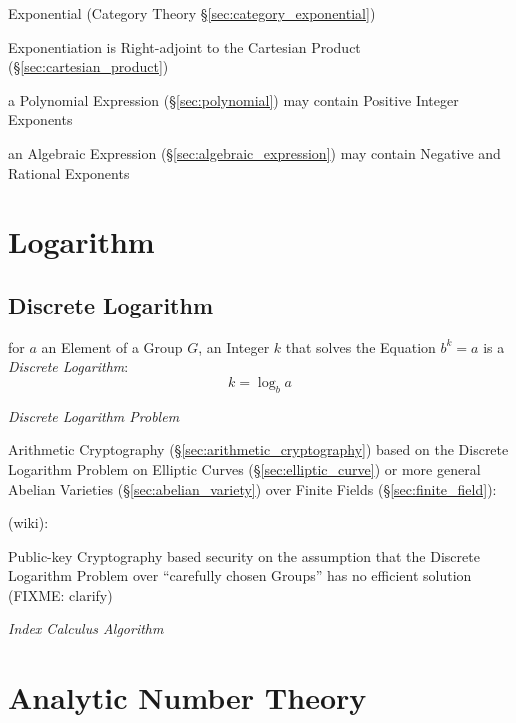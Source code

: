 \fist Exponential (Category Theory \S\ref{sec:category_exponential})

Exponentiation is Right-adjoint to the Cartesian Product
(\S\ref{sec:cartesian_product})

a Polynomial Expression (\S\ref{sec:polynomial}) may contain
Positive Integer Exponents

an Algebraic Expression (\S\ref{sec:algebraic_expression}) may contain Negative
and Rational Exponents



\section{Logarithm}\label{sec:logarithm}

\subsection{Discrete Logarithm}\label{sec:discrete_logarithm}

for $a$ an Element of a Group $G$, an Integer $k$ that solves the Equation $b^k
= a$ is a \emph{Discrete Logarithm}:
\[
  k = \log_b a
\]

\emph{Discrete Logarithm Problem}

\fist Arithmetic Cryptography (\S\ref{sec:arithmetic_cryptography}) based on
the Discrete Logarithm Problem on Elliptic Curves (\S\ref{sec:elliptic_curve})
or more general Abelian Varieties (\S\ref{sec:abelian_variety}) over Finite
Fields (\S\ref{sec:finite_field}):

(wiki):

Public-key Cryptography based security on the assumption that the Discrete
Logarithm Problem over ``carefully chosen Groups'' has no efficient solution
(FIXME: clarify)


\emph{Index Calculus Algorithm}



\section{Analytic Number Theory}\label{sec:analytic_number_theory}

